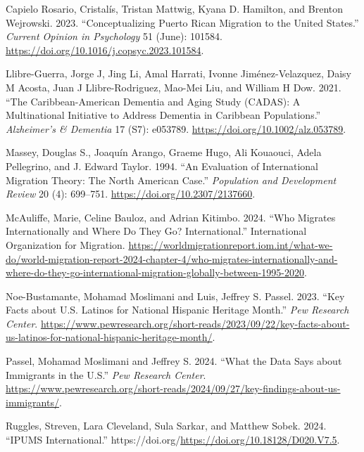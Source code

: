\documentclass[
]{article}
\newlength{\cslhangindent}
\newenvironment{CSLReferences}[2] %
 {\begin{list}{}{%
  \setlength{\itemindent}{0pt}
  \setlength{\leftmargin}{0pt}
  \setlength{\parsep}{0pt}
  \ifodd #1
   \setlength{\leftmargin}{\cslhangindent}
   \setlength{\itemindent}{-1\cslhangindent}
  \fi
  \setlength{\itemsep}{#2\baselineskip}}}
 {\end{list}}
\begin{document}
\label{refs}
\begin{CSLReferences}{1}{0}
Capielo Rosario, Cristalís, Tristan Mattwig, Kyana D. Hamilton, and
Brenton Wejrowski. 2023. {``Conceptualizing {Puerto} {Rican} Migration
to the {United} {States}.''} \emph{Current Opinion in Psychology} 51
(June): 101584. \url{https://doi.org/10.1016/j.copsyc.2023.101584}.

Llibre-Guerra, Jorge J, Jing Li, Amal Harrati, Ivonne Jiménez-Velazquez,
Daisy M Acosta, Juan J Llibre-Rodriguez, Mao-Mei Liu, and William H Dow.
2021. {``The {Caribbean}-{American} {Dementia} and {Aging} {Study}
({CADAS}): {A} Multinational Initiative to Address Dementia in
{Caribbean} Populations.''} \emph{Alzheimer's \& Dementia} 17 (S7):
e053789. \url{https://doi.org/10.1002/alz.053789}.

Massey, Douglas S., Joaquín Arango, Graeme Hugo, Ali Kouaouci, Adela
Pellegrino, and J. Edward Taylor. 1994. {``An {Evaluation} of
{International} {Migration} {Theory}: {The} {North} {American}
{Case}.''} \emph{Population and Development Review} 20 (4): 699--751.
\url{https://doi.org/10.2307/2137660}.

McAuliffe, Marie, Celine Bauloz, and Adrian Kitimbo. 2024. {``Who
Migrates Internationally and Where Do They Go? {International}.''}
International Organization for Migration.
\url{https://worldmigrationreport.iom.int/what-we-do/world-migration-report-2024-chapter-4/who-migrates-internationally-and-where-do-they-go-international-migration-globally-between-1995-2020}.

Noe-Bustamante, Mohamad Moslimani and Luis, Jeffrey S. Passel. 2023.
{``Key Facts about {U}.{S}. {Latinos} for {National} {Hispanic}
{Heritage} {Month}.''} \emph{Pew Research Center}.
\url{https://www.pewresearch.org/short-reads/2023/09/22/key-facts-about-us-latinos-for-national-hispanic-heritage-month/}.

Passel, Mohamad Moslimani and Jeffrey S. 2024. {``What the Data Says
about Immigrants in the {U}.{S}.''} \emph{Pew Research Center}.
\url{https://www.pewresearch.org/short-reads/2024/09/27/key-findings-about-us-immigrants/}.

Ruggles, Streven, Lara Cleveland, Sula Sarkar, and Matthew Sobek. 2024.
{``{IPUMS} {International}.''}
https://doi.org/\url{https://doi.org/10.18128/D020.V7.5}.

\end{CSLReferences}
\end{document}

